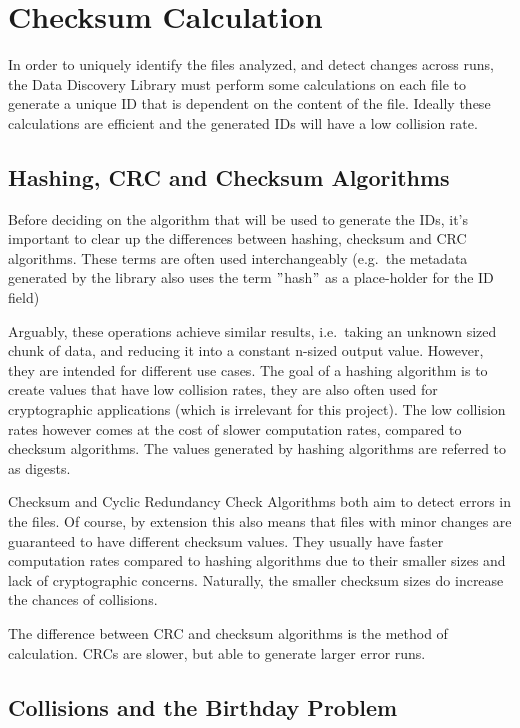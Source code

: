 \usepackage{bchart}

\section{Checksum Calculation}

In order to uniquely identify the files analyzed, and detect changes across runs, the Data Discovery Library must
perform some calculations on each file to generate a unique ID that is dependent on the content of the file.
Ideally these calculations are efficient and the generated IDs will have a low collision rate.

\subsection{Hashing, CRC and Checksum Algorithms}
Before deciding on the algorithm that will be used to generate the IDs, it's important to clear up the differences
between hashing, checksum and CRC algorithms.
These terms are often used interchangeably (e.g.\ the metadata generated by the library also uses the term \("\)hash\("\)
as a place-holder for the ID field)

Arguably, these operations achieve similar results, i.e.\ taking an unknown sized chunk of data, and reducing it into
a constant n-sized output value.
However, they are intended for different use cases.
The goal of a hashing algorithm is to create values that have low
collision rates, they are also often used for cryptographic applications (which is irrelevant for this project).
The low collision rates however comes at the cost of slower computation rates, compared to checksum algorithms.
The values generated by hashing algorithms are referred to as digests.

\newline

Checksum and Cyclic Redundancy Check Algorithms both aim to detect errors in the files.
Of course, by extension this
also means that files with minor changes are guaranteed to have different checksum values.
They usually have
faster computation rates compared to hashing algorithms due to their smaller sizes and lack of cryptographic concerns.
Naturally, the smaller checksum sizes do increase the chances of collisions.

The difference between CRC and checksum algorithms is the method of calculation.
CRCs are slower, but able to generate larger error runs.

\subsection{Collisions and the Birthday Problem}

